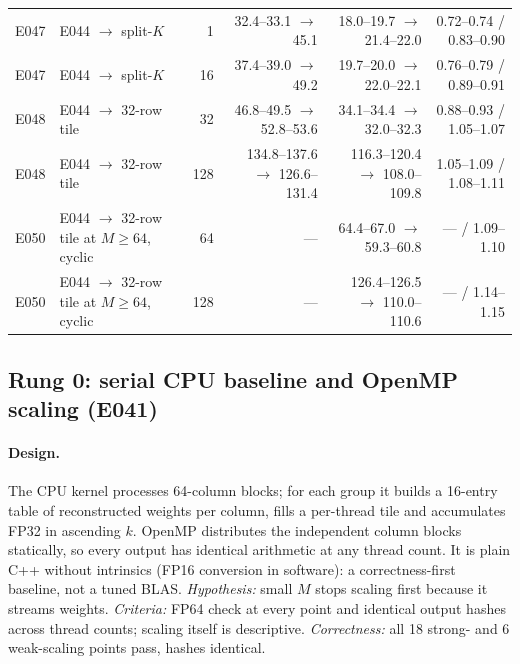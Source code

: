 \documentclass[sigconf,nonacm]{acmart}
\begin{document}
\begin{table}[t]
\begin{tabular}{llrrrr}
E047 & E044 $\to$ split-$K$ & 1 & 32.4--33.1 $\to$ 45.1 & 18.0--19.7 $\to$ 21.4--22.0 & 0.72--0.74 / 0.83--0.90 \\
E047 & E044 $\to$ split-$K$ & 16 & 37.4--39.0 $\to$ 49.2 & 19.7--20.0 $\to$ 22.0--22.1 & 0.76--0.79 / 0.89--0.91 \\
E048 & E044 $\to$ 32-row tile & 32 & 46.8--49.5 $\to$ 52.8--53.6 & 34.1--34.4 $\to$ 32.0--32.3 & 0.88--0.93 / 1.05--1.07 \\
E048 & E044 $\to$ 32-row tile & 128 & 134.8--137.6 $\to$ 126.6--131.4 & 116.3--120.4 $\to$ 108.0--109.8 & 1.05--1.09 / 1.08--1.11 \\
E050 & E044 $\to$ 32-row tile at $M \ge 64$, cyclic & 64 & --- & 64.4--67.0 $\to$ 59.3--60.8 & --- / 1.09--1.10 \\
E050 & E044 $\to$ 32-row tile at $M \ge 64$, cyclic & 128 & --- & 126.4--126.5 $\to$ 110.0--110.6 & --- / 1.14--1.15 \\
\bottomrule
\end{tabular}
\end{table}

\subsection{Rung 0: serial CPU baseline and OpenMP scaling (E041)}
\paragraph{Design.} The CPU kernel processes 64-column blocks; for each group it builds a 16-entry table of reconstructed weights per column, fills a per-thread tile and accumulates FP32 in ascending $k$. OpenMP distributes the independent column blocks statically, so every output has identical arithmetic at any thread count. It is plain C++ without intrinsics (FP16 conversion in software): a correctness-first baseline, not a tuned BLAS. \emph{Hypothesis:} small $M$ stops scaling first because it streams weights. \emph{Criteria:} FP64 check at every point and identical output hashes across thread counts; scaling itself is descriptive. \emph{Correctness:} all 18 strong- and 6 weak-scaling points pass, hashes identical.
\end{document}
